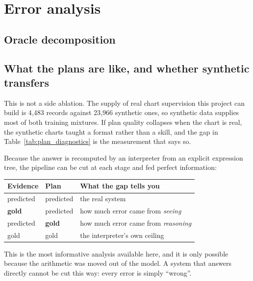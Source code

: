 \section{Error analysis}
\label{sec:analysis}

\subsection{Oracle decomposition}



\subsection{What the plans are like, and whether synthetic transfers}
\label{sec:analysis:transfer}



This is not a side ablation. The supply of real chart supervision this project
can build is 4{,}483 records against 23{,}966 synthetic ones, so synthetic data
supplies most of both training mixtures. If plan quality collapses when the chart
is real, the synthetic charts taught a format rather than a skill, and the gap in
Table~\ref{tab:plan_diagnostics} is the measurement that says so.

Because the answer is recomputed by an interpreter from an explicit expression tree, the pipeline can
be cut at each stage and fed perfect information:

\begin{center}
\begin{tabular}{lll}
\toprule
Evidence & Plan & What the gap tells you \\
\midrule
predicted & predicted & the real system \\
\textbf{gold} & predicted & how much error came from \emph{seeing} \\
predicted & \textbf{gold} & how much error came from \emph{reasoning} \\
gold & gold & the interpreter's own ceiling \\
\bottomrule
\end{tabular}
\end{center}

This is the most informative analysis available here, and it is only possible because the arithmetic
was moved out of the model. A system that answers directly cannot be cut this way: every error is
simply ``wrong''.


